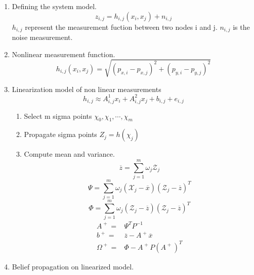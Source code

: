 \documentclass[12pt]{article}
\begin{document}
\begin{enumerate}
\item Defining the system model.
	\begin{equation}
z_{i,j}=h_{i,j}(x_{i},x_{j})+n_{i,j}
\end{equation}
$h_{i,j}$ represent the measurement fuction between two nodes i and j. $n_{i,j}$ is the noise measurement. \\

\item Nonlinear measurement function.
	\begin{equation}
	h_{i,j}(x_{i},x_{j})=\sqrt{(p_{x,i}-p_{x,j})^{2}+(p_{y,i}-p_{y,j})^{2}}
	\end{equation}

\item Linearization model of non linear measurements
\begin{equation}
h_{i,j} \approx A_{i,j}^{1}x_{i}+A_{i,j}^{2}x_{j}+b_{i,j}+e_{i,j}
\end{equation}	
\begin{enumerate}
\item Select m sigma points $\chi_{0},\chi_{1},\cdots,\chi_{m}$
\item Propagate sigma points $Z_{j}=h(\chi_{j})$
\item Compute mean and variance.
\begin{equation}
\overline{z}=\sum _{j=1}^{m}\omega _{j}\mathcal {Z}_{j}
\end{equation}
\begin{equation}
\Psi =\sum _{j=1}^{m}\omega _{j}\left(\mathcal
 {X}_{j}-\overline{x}\right)\left(\mathcal {Z}_{j}-\overline{z}\right)^{T}
\end{equation}
\begin{equation}
\Phi =\sum _{j=1}^{m}\omega _{j}\left(\mathcal {Z}_{j}-\overline{z}\right)\left(\mathcal {Z}_{j}-\overline{z}\right)^{T}
\end{equation}
\begin{equation}
\begin{split}
 A^{\;+\;}=&\Psi ^{T}P^{-1} \\
 b^{\;+\;}=&\overline{z}-A^{\;+\;}\overline{x}\\
 \Omega ^{\;+\;}=&\Phi -A^{\;+\;}P\left(A^{\;+\;}\right)^{T}
 \end{split}
\end{equation}
\end{enumerate}


\item Belief propagation on linearized model.
\begin{enumerate}


\end{enumerate}
\end{enumerate}
\end{document}
